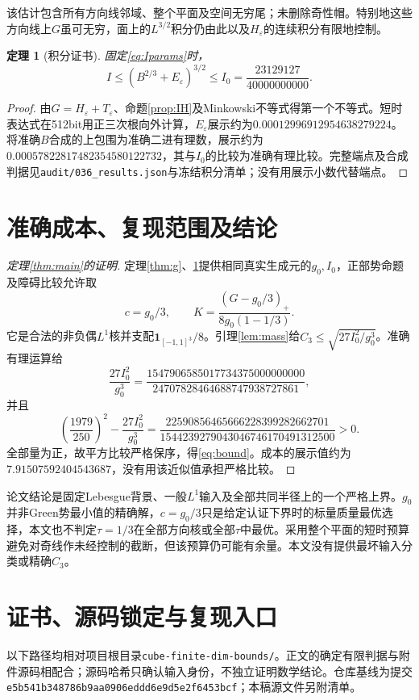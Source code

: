 \documentclass[UTF8,11pt,a4paper,fontset=fandol]{ctexart}
\newtheorem{theorem}{定理}[section]
\theoremstyle{definition}\newtheorem{definition}[theorem]{定义}
\theoremstyle{remark}\newtheorem{remark}[theorem]{注}
\newcommand{\one}{\mathbf 1}
\newcommand{\src}[1]{\nolinkurl{#1}}
\begin{document}
该估计包含所有方向线邻域、整个平面及空间无穷尾；未删除奇性帽。特别地这些方向线上$G$虽可无穷，面上的$L^{3/2}$积分仍由此以及$H_\varepsilon$的连续积分有限地控制。

\begin{theorem}[积分证书]\label{thm:I}
固定\eqref{eq:Iparams}时，
\begin{equation}\label{eq:I0}
 I\le (B^{2/3}+E_\varepsilon)^{3/2}
 \le I_0=\frac{23129127}{40000000000}.
\end{equation}
\end{theorem}
\begin{proof}
由$G=H_\varepsilon+T_\varepsilon$、命题\ref{prop:IH}及Minkowski不等式得第一个不等式。短时表达式在512bit用正三次根向外计算，$E_\varepsilon$展示约为$0.00012996912954638279224$。将准确$B$合成的上包围为准确二进有理数，展示约为
$0.00057822817482354580122732$，其与$I_0$的比较为准确有理比较。完整端点及合成判据见\src{audit/036_results.json}与冻结积分清单；没有用展示小数代替端点。
\end{proof}

\section{准确成本、复现范围及结论}
\begin{proof}[定理\ref{thm:main}的证明]
定理\ref{thm:g}、\ref{thm:I}提供相同真实生成元的$g_0,I_0$，正部势命题及障碍比较允许取
\[
 c=g_0/3,\qquad K=\frac{(G-g_0/3)_+}{8g_0(1-1/3)}.
\]
它是合法的非负偶$L^1$核并支配$\one_{[-1,1]^3}/8$。引理\ref{lem:mass}给$C_3\le\sqrt{27I_0^2/g_0^3}$。准确有理运算给
\[
 \frac{27I_0^2}{g_0^3}=
 \frac{1547906585017734375000000000}{24707828464688747938727861},
\]
并且
\begin{equation}\label{eq:slack}
 \left(\frac{1979}{250}\right)^2-\frac{27I_0^2}{g_0^3}
 =\frac{22590856465666228399282662701}
 {1544239279043046746170491312500}>0.
\end{equation}
全部量为正，故平方比较严格保序，得\eqref{eq:bound}。成本的展示值约为$7.91507592404543687$，没有用该近似值承担严格比较。
\end{proof}

论文结论是固定Lebesgue背景、一般$L^1$输入及全部共同半径上的一个严格上界。$g_0$并非Green势最小值的精确解，$c=g_0/3$只是给定认证下界时的标量质量最优选择，本文也不判定$\tau=1/3$在全部方向核或全部$\tau$中最优。采用整个平面的短时预算避免对奇线作未经控制的截断，但该预算仍可能有余量。本文没有提供最坏输入分类或精确$C_3$。

\appendix
\section{证书、源码锁定与复现入口}\label{app:reproduce}
以下路径均相对项目根目录\src{cube-finite-dim-bounds/}。正文的确定有限判据与附件源码相配合；源码哈希只确认输入身份，不独立证明数学结论。仓库基线为提交\texttt{e5b541b348786b9aa0906}\allowbreak\texttt{eddd6e9d5e2f6453bcf}；本稿源文件另附清单。
\end{document}
